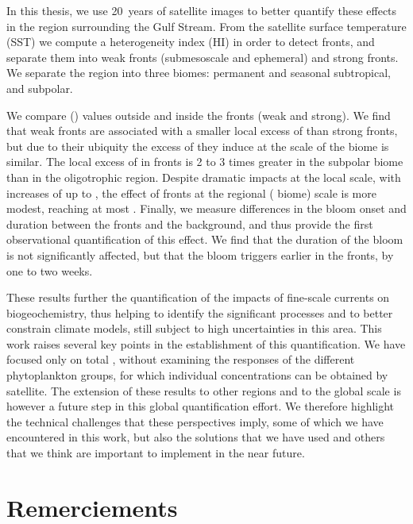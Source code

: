 In this thesis, we use 20~years of satellite images to better quantify these effects in the region surrounding the Gulf Stream.
From the satellite surface temperature (SST) we compute a heterogeneity index (HI) in order to detect fronts, and separate them into weak fronts (submesoscale and ephemeral) and strong fronts.
We separate the region into three biomes: permanent and seasonal subtropical, and subpolar.

We compare  () values outside and inside the fronts (weak and strong).
We find that weak fronts are associated with a smaller local excess of  than strong fronts, but due to their ubiquity the excess of  they induce at the scale of the biome is similar.
The local excess of  in fronts is 2 to 3 times greater in the subpolar biome than in the oligotrophic region.
Despite dramatic impacts at the local scale, with increases of up to , the effect of fronts at the regional ( biome) scale is more modest, reaching at most .
Finally, we measure differences in the bloom onset and duration between the fronts and the background, and thus provide the first observational quantification of this effect.
We find that the duration of the bloom is not significantly affected, but that the bloom triggers earlier in the fronts, by one to two weeks.

These results further the quantification of the impacts of fine-scale currents on biogeochemistry, thus helping to identify the significant processes and to better constrain climate models, still subject to high uncertainties in this area.
This work raises several key points in the establishment of this quantification.
We have focused only on total , without examining the responses of the different phytoplankton groups, for which individual concentrations can be obtained by satellite.
The extension of these results to other regions and to the global scale is however a future step in this global quantification effort.
We therefore highlight the technical challenges that these perspectives imply, some of which we have encountered in this work, but also the solutions that we have used and others that we think are important to implement in the near future.


\clearpage
\thispagestyle{thesis-empty}

\section*{Remerciements}
\label{sec:thanks}

